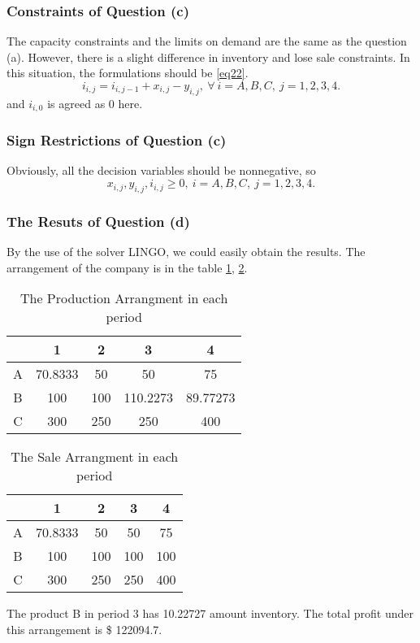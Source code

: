 \documentclass[12pt]{article}
\begin{document}
\subsubsection{Constraints of Question (c)}
The capacity constraints and the limits on demand are the same as the question (a). However, there is a slight difference in inventory and lose sale constraints. In this situation, the formulations should be \ref{eq22}.
\begin{equation}
\label{eq22}
i_{i,j} = i_{i,j-1}+x_{i,j}-y_{i,j},\ \forall\ i=A,B,C,\ j=1,2,3,4.
\end{equation}
and $i_{i,0}$ is agreed as 0 here.
\subsubsection{Sign Restrictions of Question (c)}
Obviously, all the decision variables should be nonnegative, so
\begin{equation}
	\label{eq24}
	x_{i,j},y_{i,j},i_{i,j}\geq 0,\ i=A,B,C,\ j=1,2,3,4.
\end{equation}
\subsubsection{The Resuts of Question (d)}
By the use of the solver LINGO, we could easily obtain the results. The arrangement of the company is in the table \ref{tab23}, \ref{tab24}.
\begin{table}[H]
	\centering
	\setlength{\belowcaptionskip}{0.1cm}
	\caption{The Production Arrangment in each period}
	\label{tab23}
	\begin{tabular}{ccccc}
		\hline
		\hline
		&1&2&3&4\\
		\hline
		A&70.8333&50&50&75\\
		B&100&100&110.2273&89.77273\\
		C&300&250&250&400\\	
		\hline
		\hline
	\end{tabular}
\end{table}
\begin{table}[H]
	\centering
	\setlength{\belowcaptionskip}{0.1cm}
	\caption{The Sale Arrangment in each period}
	\label{tab24}
	\begin{tabular}{ccccc}
		\hline
		\hline
		&1&2&3&4\\
		\hline
		A&70.8333&50&50&75\\
		B&100&100&100&100\\
		C&300&250&250&400\\	
		\hline
		\hline
	\end{tabular}
\end{table}
\noindent The product B in period 3 has 10.22727 amount inventory. The total profit under this arrangement is \$ 122094.7.
\end{document}
